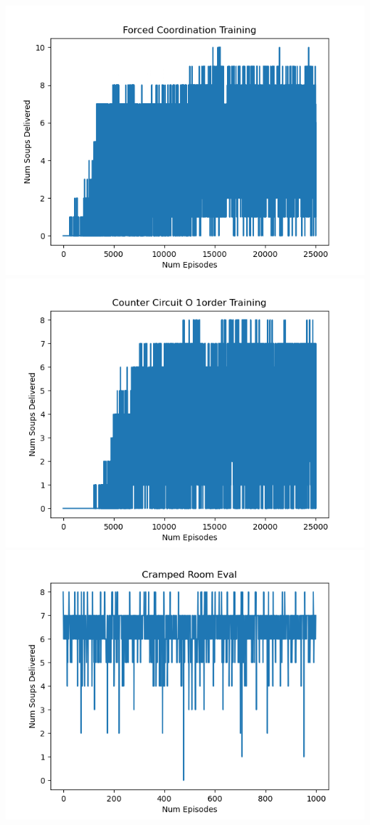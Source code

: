 \documentclass[conference]{IEEEtran}
\begin{document}
\includegraphics[scale=0.5]{forcedcoord_training.png}
\includegraphics[scale=0.5]{countercircuit_training.png}
\includegraphics[scale=0.5]{crampedroom_eval.png}
\end{document}
